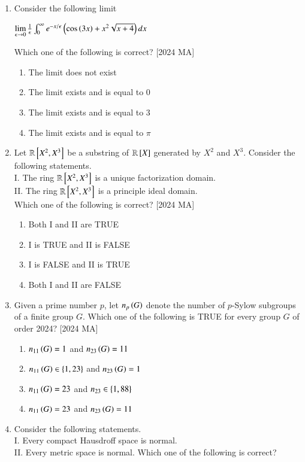 \documentclass[journal]{IEEEtran}
\begin{document}
\begin{enumerate}
    \item Consider the following limit 
    \begin{center}
        $\lim\limits_{\epsilon \to 0} \frac{1}{\epsilon} \int_0^\infty e^{-x / \epsilon}\left(\cos{\ensuremath{\left(3x\right)}} + x^2  \sqrt{x +4}\right)dx$
    \end{center}
    Which one of the following is correct? \hfill [2024 MA]
    \begin{enumerate}
        \item The limit does not exist
        \item The limit exists and is equal to 0
        \item The limit exists and is equal to 3
        \item The limit exists and is equal to $\pi$
    \end{enumerate}
    \item Let $\mathbb{R}{}\left[X^2, X^3\right]$ be a substring of $\mathbb{R} {}\left[X\right]$ generated by $X^2$ and $X^3$. Consider the following
statements.\\
I. The ring $\mathbb{R} {}\left[X^2, X^3\right]$ is a unique factorization domain.\\
II. The ring $\mathbb{R} {}\left[X^2, X^3\right]$ is a principle ideal domain. \\
Which one of the following is correct? \hfill [2024 MA]
\begin{enumerate}
    \item Both I and II are TRUE
    \item I is TRUE and II is FALSE
    \item I is FALSE and II is TRUE
    \item Both I and II are FALSE
\end{enumerate}
\item Given a prime number  $p$, let $n_p\left(G\right)$ denote the number of $p$-Sylow subgroups of a finite group $G$. Which one of the following is TRUE for every group $G$ of order 2024? \hfill [2024 MA]
\begin{enumerate}
    \item $n_{11}\left(G\right) = 1$ and $ n_{23}\left(G\right) = 11$
    \item $n_{11}\left(G\right) \in \left\{1,23\right\}$ and 
    $n_{23}\left(G\right) = 1$
    \item $n_{11}\left(G\right) = 23$ and $n_{23} \in \left\{1,88\right\}$
    \item $n_{11}\left(G\right) = 23$ and $n_{23}\left(G\right) = 11$
\end{enumerate}
\item Consider the following statements.\\
I. Every compact Hausdroff space is normal. \\
II. Every metric space is normal.
Which one of the following is correct?


\end{enumerate}
\end{document}
